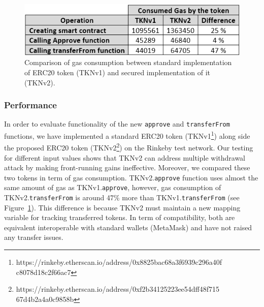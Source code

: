 
\begin{figure}[t]
	\centering
	\includegraphics[width=1.0\linewidth]{figures/multiple_withdrawal_22.png}
	\caption{Comparison of gas consumption between standard implementation of ERC20 token (TKNv1) and secured implementation of it (TKNv2).\label{fig:gas}}
\end{figure}

\subsubsection*{Performance} In order to evaluate functionality of the new \texttt{approve} and \texttt{transferFrom} functions, we have implemented a standard ERC20 token (TKNv1\footnote{https://rinkeby.etherscan.io/address/0x8825bac68a3f6939c296a40f c8078d18c2f66ac7}) along side the proposed ERC20 token (TKNv2\footnote{https://rinkeby.etherscan.io/address/0xf2b34125223ee54dff48f715 67d4b2a4a0c9858b}) on the Rinkeby test network. Our testing for different input values shows that TKNv2 can address multiple withdrawal attack by making front-running gains ineffective. Moreover, we compared these two tokens in term of gas consumption. TKNv2.\texttt{approve} function uses almost the same amount of gas as TKNv1.\texttt{approve}, however, gas consumption of TKNv2.\texttt{transferFrom} is around 47\% more than TKNv1.\texttt{transferFrom} (see Figure~\ref{fig:gas}). This difference is because TKNv2 must maintain a new mapping variable for tracking transferred tokens. In term of compatibility, both are equivalent interoperable with standard wallets (\eg MetaMask) and have not raised any transfer issues.




%	


